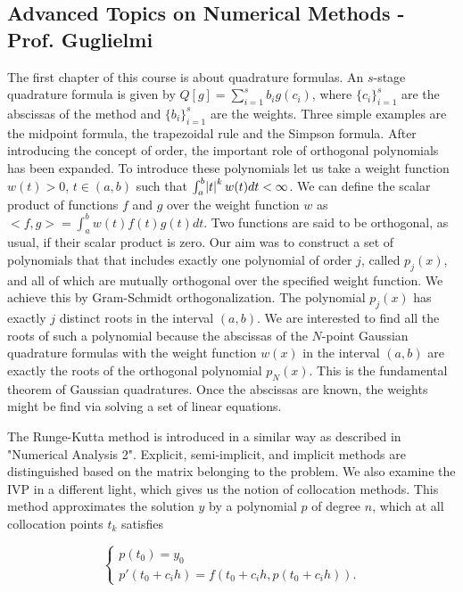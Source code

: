 \documentclass{article}
\begin{document}
\subsection{Advanced Topics on Numerical Methods - Prof. Guglielmi}
The first chapter of this course is about quadrature formulas. An $s$-stage quadrature formula is given by $Q[g] = \sum_{i=1}^s b_i g(c_i)$, where $\{c_i\}_{i=1}^s$  are the abscissas of the method and $\{b_i\}_{i=1}^s$ are the weights. Three simple examples are the midpoint formula, the trapezoidal rule and the Simpson formula. After introducing the concept of order, the important role of orthogonal polynomials has been expanded. To introduce these polynomials let us take a weight function $w(t) > 0$, $t \in (a,b)$ such that $\int_a^b \abs{t}^k w(t) dt < \infty$. We can define the scalar product of functions $f$ and $g$ over the weight function $w$ as $<f, g> = \int_a ^ b w(t) f(t) g(t) dt$. Two functions are said to be orthogonal, as usual, if their scalar product is zero. Our aim was to construct a set of polynomials that that includes exactly one polynomial of order $j$, called $p_j (x)$, and all of which are mutually orthogonal over the specified weight function. We achieve this by Gram-Schmidt orthogonalization. The polynomial $p_j (x)$ has exactly $j$ distinct roots in the interval $(a,b)$. We are interested to find all the roots of such a polynomial because the abscissas of the $N$-point Gaussian quadrature formulas with the weight function $w(x)$ in the interval $(a,b)$ are exactly the roots of the orthogonal polynomial $p_N(x)$. This is the fundamental theorem of Gaussian quadratures. Once the abscissas are known, the weights might be find via solving a set of linear equations.

The Runge-Kutta method is introduced in a similar way as described in "Numerical Analysis 2". Explicit, semi-implicit, and implicit methods are distinguished based on the matrix belonging to the problem. We also examine the IVP in a different light, which gives us the notion of collocation methods. This method approximates the solution $y$ by a polynomial $p$ of degree $n$, which at all collocation points $t_k$ satisfies

\begin{equation}
   \begin{cases}
               p(t_0) = y_0\\
               p'(t_0 + c_i h) = f(t_0 + c_i h, p(t_0 + c_i h)).
   \end{cases}
\end{equation}
\end{document}
